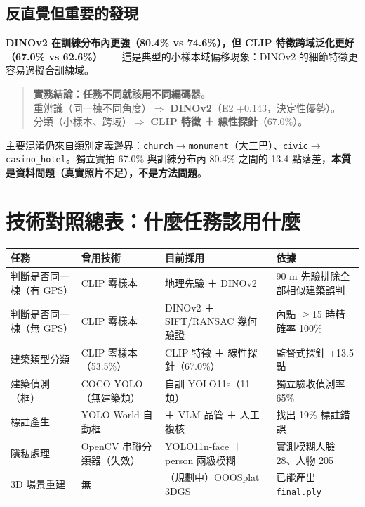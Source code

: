 \documentclass[11pt,a4paper,fontset=windows]{ctexart}
\begin{document}
\subsection{反直覺但重要的發現}
\textbf{DINOv2 在訓練分布內更強（80.4\% vs 74.6\%），但 CLIP 特徵跨域泛化更好（67.0\% vs 62.6\%）}——這是典型的小樣本域偏移現象：DINOv2 的細節特徵更容易過擬合訓練域。

\begin{quote}
\textbf{實務結論：任務不同就該用不同編碼器。}\\
重辨識（同一棟不同角度）$\Rightarrow$ \textbf{DINOv2}（E2 +0.143，決定性優勢）。\\
分類（小樣本、跨域）$\Rightarrow$ \textbf{CLIP 特徵 ＋ 線性探針}（67.0\%）。
\end{quote}

\noindent 主要混淆仍來自類別定義邊界：\texttt{church}$\to$\texttt{monument}（大三巴）、\texttt{civic}$\to$\texttt{casino\_hotel}。獨立實拍 67.0\% 與訓練分布內 80.4\% 之間的 13.4 點落差，\textbf{本質是資料問題（真實照片不足），不是方法問題}。

\section{技術對照總表：什麼任務該用什麼}

\begin{longtable}{@{}p{3.2cm}p{3.6cm}p{3.6cm}p{4.6cm}@{}}
\toprule
\textbf{任務} & \textbf{曾用技術} & \textbf{目前採用} & \textbf{依據} \\
\midrule
\endhead
判斷是否同一棟（有 GPS） & CLIP 零樣本 & 地理先驗 ＋ DINOv2 & 90 m 先驗排除全部相似建築誤判 \\
判斷是否同一棟（無 GPS） & CLIP 零樣本 & DINOv2 ＋ SIFT/RANSAC 幾何驗證 & 內點 $\ge$15 時精確率 100\% \\
建築類型分類 & CLIP 零樣本（53.5\%） & CLIP 特徵 ＋ 線性探針（67.0\%） & 監督式探針 +13.5 點 \\
建築偵測（框） & COCO YOLO（無建築類） & 自訓 YOLO11s（11 類） & 獨立驗收偵測率 65\% \\
標註產生 & YOLO-World 自動框 & ＋ VLM 品管 ＋ 人工複核 & 找出 19\% 標註錯誤 \\
隱私處理 & OpenCV 串聯分類器（失效） & YOLO11n-face ＋ person 兩級模糊 & 實測模糊人臉 28、人物 205 \\
3D 場景重建 & 無 & （規劃中）OOOSplat 3DGS & 已能產出 \texttt{final.ply} \\
\bottomrule
\end{longtable}
\end{document}
